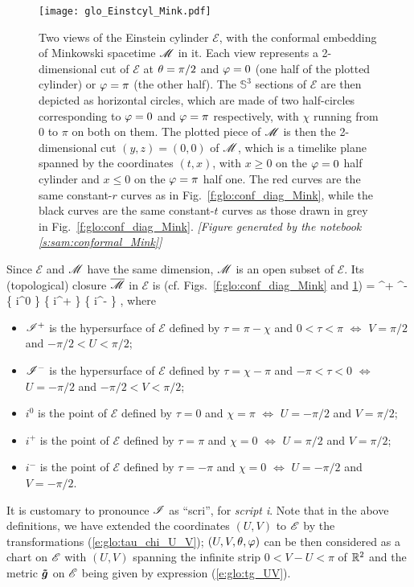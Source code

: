 \begin{figure}
\centerline{\texttt{[image: glo\_Einstcyl\_Mink.pdf]}}
\caption[]{\label{f:glo:Einstcyl_Mink}\footnotesize
Two views of the Einstein cylinder $\mathscr{E}$, with the conformal embedding of
Minkowski spacetime $\mathscr{M}$ in it. Each view represents a 2-dimensional cut of $\mathscr{E}$
at $\theta=\pi/2$ and $\varphi=0$ (one half of the plotted cylinder) or $\varphi=\pi$ (the other half).
The $\mathbb{S}^3$ sections of $\mathscr{E}$ are then depicted as horizontal circles,
which are made of two half-circles corresponding to $\varphi=0$ and $\varphi=\pi$
respectively, with $\chi$ running from $0$ to $\pi$ on both on them.
The plotted piece of $\mathscr{M}$ is then the
2-dimensional cut $(y,z) = (0,0)$ of $\mathscr{M}$, which is a timelike plane spanned
by the coordinates $(t,x)$, with $x\geq 0$ on the $\varphi=0$ half cylinder
and $x\leq 0$ on the $\varphi=\pi$ half one.
The red curves are the same constant-$r$ curves
as in Fig.~\ref{f:glo:conf_diag_Mink}, while the black curves are
the same constant-$t$ curves as those drawn in grey in Fig.~\ref{f:glo:conf_diag_Mink}.
\textsl{[Figure generated by the notebook \ref{s:sam:conformal_Mink}]}
}
\end{figure}

Since $\mathscr{E}$ and $\mathscr{M}$ have the same dimension, $\mathscr{M}$ is an open subset of $\mathscr{E}$.
Its (topological) closure $\overline{\mathscr{M}}$ in $\mathscr{E}$ is (cf.
Figs.~\ref{f:glo:conf_diag_Mink} and \ref{f:glo:Einstcyl_Mink})
\be
    \overline{\M} = \M \cup \scri^+ \cup \scri^- \cup \left\{ i^0 \right\} \cup
            \left\{ i^+ \right\} \cup \left\{ i^- \right\} ,
\ee
where
\begin{itemize}
\item $\mathscr{I}^+$ is the hypersurface of $\mathscr{E}$ defined by
$\tau = \pi - \chi$ and $0 < \tau < \pi$ $\iff$
$V=\pi/2$ and $-\pi/2< U < \pi/2$;
\item $\mathscr{I}^-$ is the hypersurface of $\mathscr{E}$ defined by
$\tau = \chi - \pi $ and $-\pi  < \tau < 0$ $\iff$
$U=-\pi/2$ and $-\pi/2< V < \pi/2$;
\item $i^0$ is the point of $\mathscr{E}$ defined by $\tau=0$ and $\chi=\pi$
$\iff$ $U=-\pi/2$ and $V=\pi/2$;
\item $i^+$ is the point of $\mathscr{E}$ defined by $\tau=\pi$ and $\chi=0$
$\iff$ $U=\pi/2$ and $V=\pi/2$;
\item $i^-$ is the point of $\mathscr{E}$ defined by $\tau=-\pi$ and $\chi=0$
$\iff$ $U=-\pi/2$ and $V=-\pi/2$.
\end{itemize}
It is customary to pronounce $\mathscr{I}$ as ``scri'', for \emph{script i}.
Note that in the above definitions, we have extended the coordinates $(U,V)$
to $\mathscr{E}$ by the transformations (\ref{e:glo:tau_chi_U_V}); $(U,V,\theta,\varphi)$
can be then considered as a chart on $\mathscr{E}$ with $(U,V)$ spanning the
infinite strip $0<V-U<\pi$ of $\mathbb{R}^2$ and the metric $\bm{\tilde{g}}$ on $\mathscr{E}$
being given by expression (\ref{e:glo:tg_UV}).

